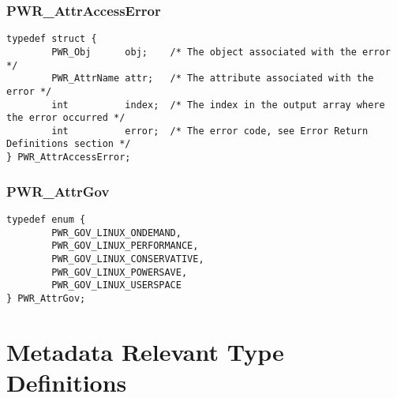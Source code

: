 \documentclass[12pt]{report} %
\begin{document}

\subsubsection{PWR_AttrAccessError}\label{type:AttrAccessError}
\begin{center}
\begin{minipage}{.95\linewidth}%
\begin{lstlisting}
typedef struct {
        PWR_Obj      obj;    /* The object associated with the error */
        PWR_AttrName attr;   /* The attribute associated with the error */
        int          index;  /* The index in the output array where the error occurred */
        int          error;  /* The error code, see Error Return Definitions section */
} PWR_AttrAccessError;
\end{lstlisting}
\end{minipage}
\end{center}


\subsubsection{PWR_AttrGov}\label{type:AttrGov}
\begin{center}
\begin{minipage}{.95\linewidth}%
\begin{lstlisting}
typedef enum {
        PWR_GOV_LINUX_ONDEMAND,
        PWR_GOV_LINUX_PERFORMANCE,
        PWR_GOV_LINUX_CONSERVATIVE,
        PWR_GOV_LINUX_POWERSAVE,
        PWR_GOV_LINUX_USERSPACE
} PWR_AttrGov;
\end{lstlisting}
\end{minipage}
\end{center}


\section{Metadata Relevant Type Definitions}\label{sec:MetadataTypeDefinitions}
\end{document}
